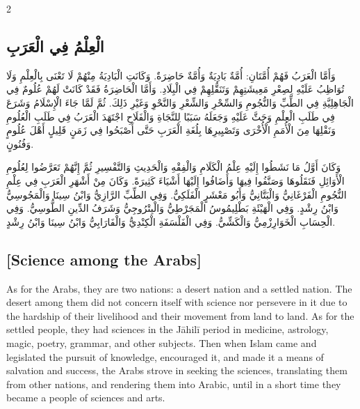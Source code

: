 \documentclass[11pt,a4paper]{article}
\newcommand{\ar}[1]{\arabicfont\beginR #1\endR}
\begin{document}
\begin{paracol}{2}
\sloppy

\begin{leftcolumn}
\subsection*{\ar{الْعِلْمُ فِي الْعَرَبِ}}
\vspace{0.3cm}
{\arabicfont\beginR
وَأَمَّا الْعَرَبُ فَهُمْ أُمَّتَانِ: أُمَّةٌ بَادِيَةٌ وَأُمَّةٌ حَاضِرَةٌ. وَكَانَتِ الْبَادِيَةُ مِنْهُمْ لَا تَعْنَى بِالْعِلْمِ وَلَا تُوَاظِبُ عَلَيْهِ لِصِعْرِ مَعِيشَتِهِمْ وَتَنَقُّلِهِمْ فِي الْبِلَادِ. وَأَمَّا الْحَاضِرَةُ فَقَدْ كَانَتْ لَهُمْ عُلُومٌ فِي الْجَاهِلِيَّةِ فِي الطِّبِّ وَالنُّجُومِ وَالسِّحْرِ وَالشِّعْرِ وَالنَّحْوِ وَغَيْرِ ذَلِكَ. ثُمَّ لَمَّا جَاءَ الْإِسْلَامُ وَشَرَعَ فِي طَلَبِ الْعِلْمِ وَحَثَّ عَلَيْهِ وَجَعَلَهُ سَبَبًا لِلنَّجَاةِ وَالْفَلَاحِ اجْتَهَدَ الْعَرَبُ فِي طَلَبِ الْعُلُومِ وَنَقْلِهَا مِنَ الْأُمَمِ الْأُخْرَى وَتَصْيِيرِهَا بِلُغَةِ الْعَرَبِ حَتَّى أَصْبَحُوا فِي زَمَنٍ قَلِيلٍ أَهْلَ عُلُومٍ وَفُنُونٍ.
\endR}

\vspace{0.3cm}
{\arabicfont\beginR
وَكَانَ أَوَّلُ مَا نَشَطُوا إِلَيْهِ عِلْمُ الْكَلَامِ وَالْفِقْهِ وَالْحَدِيثِ وَالتَّفْسِيرِ ثُمَّ إِنَّهُمْ تَعَرَّضُوا لِعُلُومِ الْأَوَائِلِ فَنَقَلُوهَا وَصَنَّفُوا فِيهَا وَأَضَافُوا إِلَيْهَا أَشْيَاءَ كَثِيرَةً. وَكَانَ مِنْ أَشْهَرِ الْعَرَبِ فِي عِلْمِ النُّجُومِ الْفَرْغَانِيُّ وَالْبَتَّانِيُّ وَأَبُو مَعْشَرٍ الْفَلَكِيُّ. وَفِي الطِّبِّ الرَّازِيُّ وَابْنُ سِينَا وَالْمَجُوسِيُّ وَابْنُ رِشْدٍ. وَفِي الْهَيْئَةِ بَطْلِيمُوسُ الْمَجَرْطِيُّ وَالْبِتْرُوجِيُّ وَشَرَفُ الدِّينِ الطُّوسِيُّ. وَفِي الْحِسَابِ الْخَوَارِزْمِيُّ وَالْكَشِّيُّ. وَفِي الْفَلْسَفَةِ الْكِنْدِيُّ وَالْفَارَابِيُّ وَابْنُ سِينَا وَابْنُ رِشْدٍ.
\endR}
\end{leftcolumn}

\begin{rightcolumn}
\subsection*{[Science among the Arabs]}
\vspace{0.3cm}
As for the Arabs, they are two nations: a desert nation and a settled nation. The desert among them did not concern itself with science nor persevere in it due to the hardship of their livelihood and their movement from land to land. As for the settled people, they had sciences in the J\={a}hil\={i} period in medicine, astrology, magic, poetry, grammar, and other subjects. Then when Islam came and legislated the pursuit of knowledge, encouraged it, and made it a means of salvation and success, the Arabs strove in seeking the sciences, translating them from other nations, and rendering them into Arabic, until in a short time they became a people of sciences and arts.


\end{rightcolumn}
\end{paracol}
\end{document}
